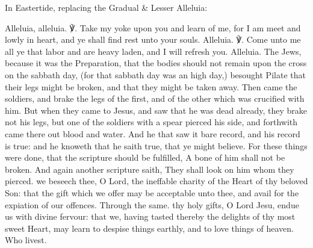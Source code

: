\begin{rubric}
{In Eastertide, replacing the Gradual \& Lesser Alleluia:}
\end{rubric}\par\noindent
Alleluia, alleluia. ℣. Take my yoke upon you and learn of me, for I am meet and lowly in heart, and ye shall find rest unto your souls. Alleluia. ℣. Come unto me all ye that labor and are heavy laden, and I will refresh you. Alleluia.
 The Jews, because it was the Preparation, that the bodies should not remain upon the cross on the sabbath day, (for that sabbath day was an high day,) besought Pilate that their legs might be broken, and that they might be taken away. Then came the soldiers, and brake the legs of the first, and of the other which was crucified with him. But when they came to Jesus, and saw that he was dead already, they brake not his legs, but one of the soldiers with a spear pierced his side, and forthwith came there out blood and water. And he that saw it bare record, and his record is true: and he knoweth that he saith true, that ye might believe. For these things were done, that the scripture should be fulfilled, A bone of him shall not be broken. And again another scripture saith, They shall look on him whom they pierced.
\secret
{} we beseech thee, O Lord, the ineffable charity of the Heart of thy beloved Son: that the gift which we offer may be acceptable unto thee, and avail for the expiation of our offences. Through the same.
\postcommunion
{} thy holy gifts, O Lord Jesu, endue us with divine fervour: that we, having tasted thereby the delights of thy most sweet Heart, may learn to despise things earthly, and to love things of heaven. Who livest.

